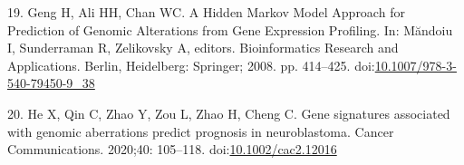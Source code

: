 \documentclass[10pt,letterpaper]{article}
\begin{document}
\leavevmode\hypertarget{ref-gengHiddenMarkovModel2008}{}%
19. Geng H, Ali HH, Chan WC. A Hidden Markov Model Approach for
Prediction of Genomic Alterations from Gene Expression Profiling. In:
Măndoiu I, Sunderraman R, Zelikovsky A, editors. Bioinformatics Research
and Applications. Berlin, Heidelberg: Springer; 2008. pp. 414--425.
doi:\href{https://doi.org/10.1007/978-3-540-79450-9_38}{10.1007/978-3-540-79450-9\_38}

\leavevmode\hypertarget{ref-heGeneSignaturesAssociated2020}{}%
20. He X, Qin C, Zhao Y, Zou L, Zhao H, Cheng C. Gene signatures
associated with genomic aberrations predict prognosis in neuroblastoma.
Cancer Communications. 2020;40: 105--118.
doi:\href{https://doi.org/10.1002/cac2.12016}{10.1002/cac2.12016}

\nolinenumbers
\end{document}
